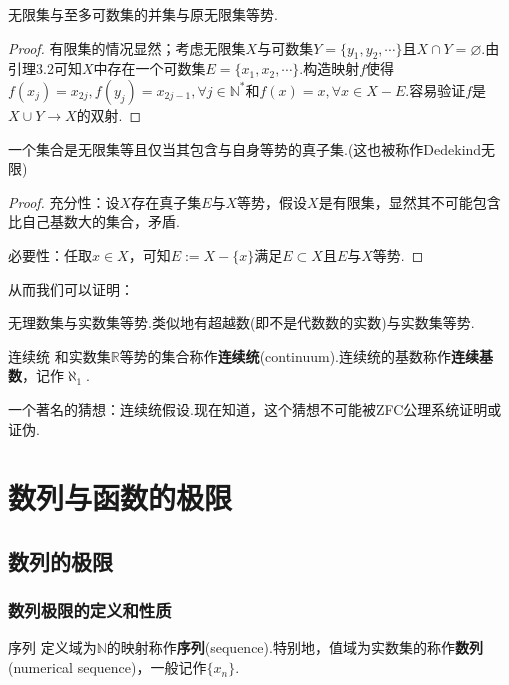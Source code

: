 \documentclass[lang=cn, zihao=5]{elegantbook}
\newcommand{\R}{\mathbb{R}}
\begin{document}
\begin{theorem}
	无限集与至多可数集的并集与原无限集等势.
\end{theorem}
\begin{proof}
	有限集的情况显然；考虑无限集$X$与可数集$Y=\{ y_1,y_2,\cdots \}$且$X \cap Y = \varnothing$.由引理3.2可知$X$中存在一个可数集$E=\{ x_1,x_2,\cdots \}$.构造映射$f$使得$f(x_j)=x_{2j},f(y_j)=x_{2j-1}, \forall j \in \mathbb{N}^*$和$f(x)=x,\forall x \in X-E$.容易验证$f$是$X \cup Y \to X$的双射.
\end{proof}

\begin{theorem}
	一个集合是无限集等且仅当其包含与自身等势的真子集.(这也被称作Dedekind无限)
\end{theorem}
\begin{proof}
	充分性：设$X$存在真子集$E$与$X$等势，假设$X$是有限集，显然其不可能包含比自己基数大的集合，矛盾.
	
	必要性：任取$x \in X$，可知$E:=X-\{x\}$满足$E \subset X$且$E$与$X$等势.
\end{proof}

从而我们可以证明：

\begin{proposition}
	无理数集与实数集等势.类似地有超越数(即不是代数数的实数)与实数集等势.
\end{proposition}

\begin{definition}{连续统}
	和实数集$\R$等势的集合称作\textbf{连续统}(continuum).连续统的基数称作\textbf{连续基数}，记作$\aleph _1$.
\end{definition}

一个著名的猜想：连续统假设.现在知道，这个猜想不可能被ZFC公理系统证明或证伪.






\chapter{数列与函数的极限}

\section{数列的极限}

\subsection{数列极限的定义和性质}

\begin{definition}{序列}
	定义域为$\mathbb{N}$的映射称作\textbf{序列}(sequence).特别地，值域为实数集的称作\textbf{数列}(numerical sequence)，一般记作$\{ x_n \}$.
\end{definition}
\end{document}

